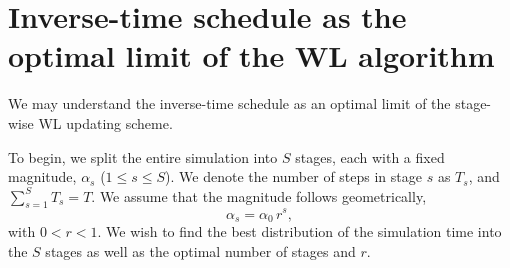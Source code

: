 \documentclass[reprint, superscriptaddress, floatfix]{revtex4-1}
\begin{document}
%




\section{\label{sec:wltoinvt}
Inverse-time schedule as the optimal limit of the WL algorithm}


We may understand the inverse-time schedule %
as an optimal limit of the stage-wise WL updating scheme.
%

To begin, we split the entire simulation into $S$ stages,
each with a fixed magnitude, $\alpha_s$ ($1 \le s \le S$).
%
We denote the number of steps in stage $s$ as $T_s$, and
$\sum_{s=1}^S T_s = T$.
%
%
We assume that
the magnitude follows geometrically,
%
\begin{equation}
  \alpha_s = \alpha_0 \, r^s
  ,
  \label{eq:alphas}
\end{equation}
%
with $0 < r < 1$.
%
%
We wish to find the best distribution of the simulation time
into the $S$ stages
as well as
the optimal number of stages and $r$.
\end{document}
